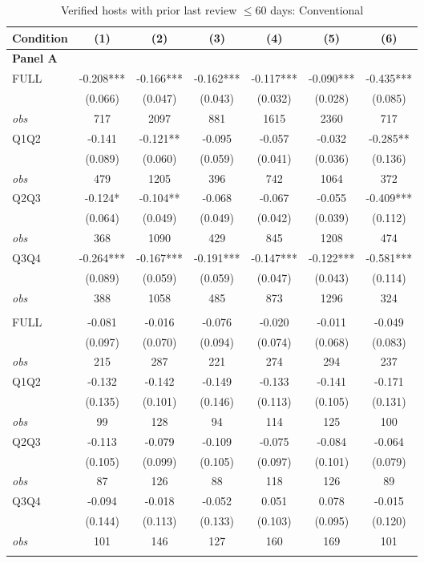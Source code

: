 \begin{table}[!htbp]
\centering
\caption{Verified hosts with prior last review $\leq60$ days: Conventional}
\begin{tabular}{lcccccc}
\toprule
Condition & (1) & (2) & (3) & (4) & (5) & (6) \\
\midrule
\multicolumn{7}{l}{\textbf{Panel A}} \\

FULL & -0.208*** & -0.166*** & -0.162*** & -0.117*** & -0.090*** & -0.435*** \\
 & (0.066) & (0.047) & (0.043) & (0.032) & (0.028) & (0.085) \\
\textit{obs} & 717 & 2097 & 881 & 1615 & 2360 & 717 \\
Q1Q2 & -0.141 & -0.121** & -0.095 & -0.057 & -0.032 & -0.285** \\
 & (0.089) & (0.060) & (0.059) & (0.041) & (0.036) & (0.136) \\
\textit{obs} & 479 & 1205 & 396 & 742 & 1064 & 372 \\
Q2Q3 & -0.124* & -0.104** & -0.068 & -0.067 & -0.055 & -0.409*** \\
 & (0.064) & (0.049) & (0.049) & (0.042) & (0.039) & (0.112) \\
\textit{obs} & 368 & 1090 & 429 & 845 & 1208 & 474 \\
Q3Q4 & -0.264*** & -0.167*** & -0.191*** & -0.147*** & -0.122*** & -0.581*** \\
 & (0.089) & (0.059) & (0.059) & (0.047) & (0.043) & (0.114) \\
\textit{obs} & 388 & 1058 & 485 & 873 & 1296 & 324 \\
\addlinespace
\multicolumn{7}{l}{\textbf{Panel B}} \\

FULL & -0.081 & -0.016 & -0.076 & -0.020 & -0.011 & -0.049 \\
 & (0.097) & (0.070) & (0.094) & (0.074) & (0.068) & (0.083) \\
\textit{obs} & 215 & 287 & 221 & 274 & 294 & 237 \\
Q1Q2 & -0.132 & -0.142 & -0.149 & -0.133 & -0.141 & -0.171 \\
 & (0.135) & (0.101) & (0.146) & (0.113) & (0.105) & (0.131) \\
\textit{obs} & 99 & 128 & 94 & 114 & 125 & 100 \\
Q2Q3 & -0.113 & -0.079 & -0.109 & -0.075 & -0.084 & -0.064 \\
 & (0.105) & (0.099) & (0.105) & (0.097) & (0.101) & (0.079) \\
\textit{obs} & 87 & 126 & 88 & 118 & 126 & 89 \\
Q3Q4 & -0.094 & -0.018 & -0.052 & 0.051 & 0.078 & -0.015 \\
 & (0.144) & (0.113) & (0.133) & (0.103) & (0.095) & (0.120) \\
\textit{obs} & 101 & 146 & 127 & 160 & 169 & 101 \\
\addlinespace
\multicolumn{7}{l}{\textbf{Panel C}} \\


\end{tabular}
\end{table}
